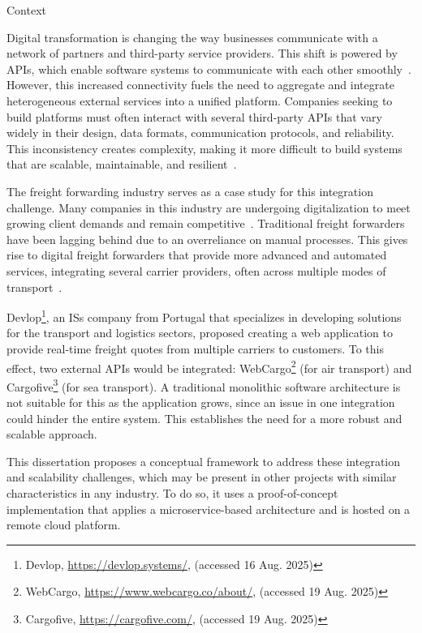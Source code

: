 \documentclass[12pt, reqno]{amsbook}
\makeatletter
\def\section{\@startsection{section}{1}%
      \z@{.5\linespacing\@plus.7\linespacing}{.25\linespacing}%
      {\normalfont\bfseries\flushleft}}
\theoremstyle{definition}
\theoremstyle{definition}
\numberwithin{section}{chapter}
\numberwithin{table}{chapter}
\numberwithin{figure}{chapter}
\makeatother
\begin{document}
\section{Context}
\label{Section:Context}

Digital transformation is changing the way businesses communicate with a network of partners and third-party service providers. This shift is powered by \acp{API}, which enable software systems to communicate with each other smoothly~\cite{Hunturu2023}. However, this increased connectivity fuels the need to aggregate and integrate heterogeneous external services into a unified platform. Companies seeking to build platforms must often interact with several third-party \acp{API} that vary widely in their design, data formats, communication protocols, and reliability. This inconsistency creates complexity, making it more difficult to build systems that are scalable, maintainable, and resilient~\cite{Huf2019}.

The freight forwarding industry serves as a case study for this integration challenge. Many companies in this industry are undergoing digitalization to meet growing client demands and remain competitive~\cite{Wang2021}. Traditional freight forwarders have been lagging behind due to an overreliance on manual processes. This gives rise to digital freight forwarders that provide more advanced and automated services, integrating several carrier providers, often across multiple modes of transport~\cite{Sullivan2021}.

Devlop\footnote{Devlop, \url{https://devlop.systems/}, (accessed 16 Aug. 2025)}, an \acp{IS} company from Portugal that specializes in developing solutions for the transport and logistics sectors, proposed creating a web application to provide real-time freight quotes from multiple carriers to customers. To this effect, two external \acp{API} would be integrated: WebCargo\footnote{WebCargo, \url{https://www.webcargo.co/about/}, (accessed 19 Aug. 2025)} (for air transport) and Cargofive\footnote{Cargofive, \url{https://cargofive.com/}, (accessed 19 Aug. 2025)} (for sea transport). A traditional monolithic software architecture is not suitable for this as the application grows, since an issue in one integration could hinder the entire system. This establishes the need for a more robust and scalable approach.

This dissertation proposes a conceptual framework to address these integration and scalability challenges, which may be present in other projects with similar characteristics in any industry. To do so, it uses a proof-of-concept implementation that applies a microservice-based architecture and is hosted on a remote cloud platform.
\end{document}
